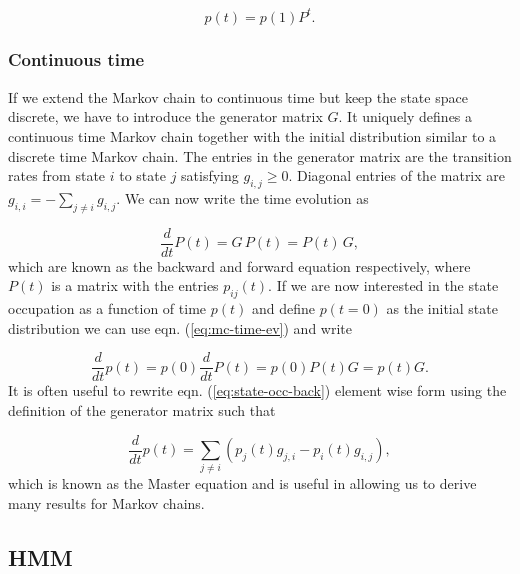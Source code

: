 \begin{equation}
  \label{eq:markov-chain}
  p(t) = p(1)P^t.
\end{equation}

\subsubsection{Continuous time}
\label{sec:continous-time}

If we extend the Markov chain to continuous time but keep the state space discrete, we have to introduce the generator matrix $G$. It uniquely defines a continuous time Markov chain together with the initial distribution similar to a  discrete time Markov chain. The entries in the generator matrix are the transition rates from state $i$ to state $j$ satisfying $g_{i,j} \geq 0$. Diagonal entries of the matrix are $g_{i,i} = - \sum_{j \neq i} g_{i,j}$. We can now write the time evolution as

\begin{equation}
  \label{eq:mc-time-ev}
  \frac{d}{dt} P(t) = G\, P(t) = P(t)\, G,
\end{equation}
which are known as the backward and forward equation respectively, where $P(t)$ is a matrix with the entries $p_{ij}(t)$. If we are now interested in the state occupation as a function of time $p(t)$ and define $p(t=0)$ as the initial state distribution we can use eqn. (\ref{eq:mc-time-ev}) and write

\begin{equation}
  \label{eq:state-occ-back}
  \frac{d}{dt}p(t) = p(0) \frac{d}{dt} P(t) = p(0) P(t) G = p(t)G.
\end{equation}
It is often useful to rewrite eqn. (\ref{eq:state-occ-back}) element wise form using the definition of the generator matrix such that

\begin{equation}
  \label{eq:mc-master}
  \frac{d}{dt} p (t) = \sum_{j\neq i} \left( p_j(t)g_{j,i} - p_i(t)g_{i,j} \right),
\end{equation}
which is known as the Master equation and is useful in allowing us to derive many results for Markov chains.

\subsection{HMM}
\label{sec:hmm}


